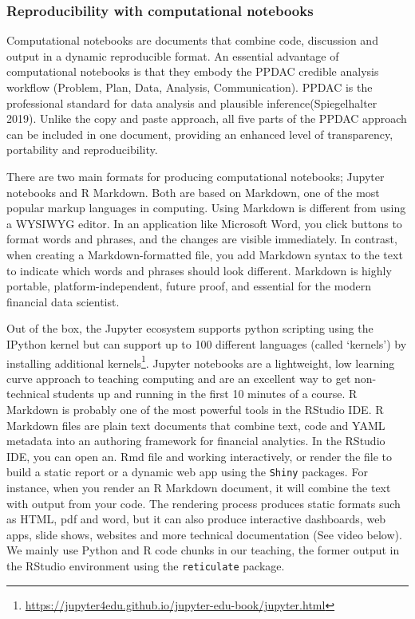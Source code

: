 \documentclass{article}
\begin{document}
\hypertarget{reproducibility-with-computational-notebooks}{%
\subsubsection{Reproducibility with computational
notebooks}\label{reproducibility-with-computational-notebooks}}

Computational notebooks are documents that combine code, discussion and
output in a dynamic reproducible format. An essential advantage of
computational notebooks is that they embody the PPDAC credible analysis
workflow (Problem, Plan, Data, Analysis, Communication). PPDAC is the
professional standard for data analysis and plausible
inference(Spiegelhalter 2019). Unlike the copy and paste approach, all
five parts of the PPDAC approach can be included in one document,
providing an enhanced level of transparency, portability and
reproducibility.

There are two main formats for producing computational notebooks;
Jupyter notebooks and R Markdown. Both are based on Markdown, one of the
most popular markup languages in computing. Using Markdown is different
from using a WYSIWYG editor. In an application like Microsoft Word, you
click buttons to format words and phrases, and the changes are visible
immediately. In contrast, when creating a Markdown-formatted file, you
add Markdown syntax to the text to indicate which words and phrases
should look different. Markdown is highly portable,
platform-independent, future proof, and essential for the modern
financial data scientist.

Out of the box, the Jupyter ecosystem supports python scripting using
the IPython kernel but can support up to 100 different languages (called
`kernels') by installing additional kernels\footnote{\url{https://jupyter4edu.github.io/jupyter-edu-book/jupyter.html}}.
Jupyter notebooks are a lightweight, low learning curve approach to
teaching computing and are an excellent way to get non-technical
students up and running in the first 10 minutes of a course. R Markdown
is probably one of the most powerful tools in the RStudio IDE. R
Markdown files are plain text documents that combine text, code and YAML
metadata into an authoring framework for financial analytics. In the
RStudio IDE, you can open an. Rmd file and working interactively, or
render the file to build a static report or a dynamic web app using the
\texttt{Shiny} packages. For instance, when you render an R Markdown
document, it will combine the text with output from your code. The
rendering process produces static formats such as HTML, pdf and word,
but it can also produce interactive dashboards, web apps, slide shows,
websites and more technical documentation (See video below). We mainly
use Python and R code chunks in our teaching, the former output in the
RStudio environment using the \texttt{reticulate} package.
\end{document}

